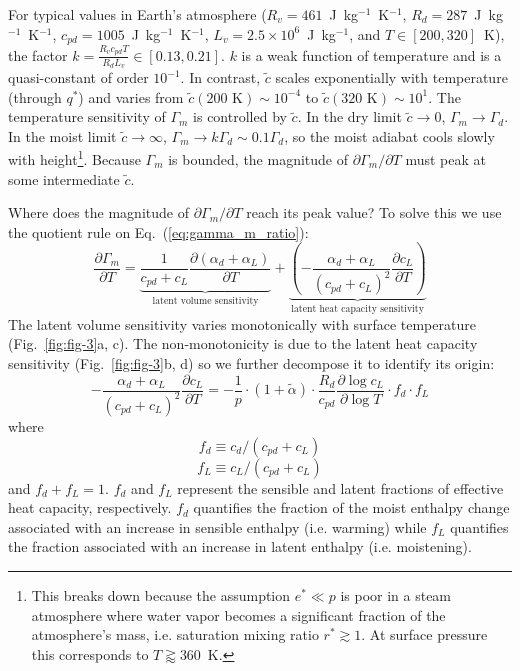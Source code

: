\documentclass[draft]{ametsocV6.1}
\begin{document}
For typical values in Earth's atmosphere ($R_v=461$~J~kg$^{-1}$~K$^{-1}$, $R_d=287$~J~kg$^{-1}$~K$^{-1}$, $c_{pd}=1005$~J~kg$^{-1}$~K$^{-1}$, $L_v=2.5\times10^6$~J~kg$^{-1}$, and $T \in [200, 320]$~K), the factor $k=\frac{R_v c_{pd}T}{R_dL_v}\in [0.13, 0.21]$. $k$ is a weak function of temperature and is a quasi-constant of order $10^{-1}$. In contrast, $\tilde{c}$ scales exponentially with temperature (through $q^*$) and varies from $\tilde{c}(200\text{~K})\sim 10^{-4}$ to $\tilde{c}(320\text{~K})\sim 10^{1}$. The temperature sensitivity of $\Gamma_m$ is controlled by $\tilde{c}$. In the dry limit $\tilde{c}\to0$, $\Gamma_m\to\Gamma_d$. In the moist limit $\tilde{c} \to \infty$, $\Gamma_m\to k\Gamma_d\sim 0.1\Gamma_d$, so the moist adiabat cools slowly with height\footnote{This breaks down because the assumption $e^*\ll p$ is poor in a steam atmosphere where water vapor becomes a significant fraction of the atmosphere's mass, i.e. saturation mixing ratio $r^*\gtrsim1$. At surface pressure this corresponds to $T\gtrapprox 360$~K.}. Because $\Gamma_m$ is bounded, the magnitude of $\partial\Gamma_m/\partial T$ must peak at some intermediate $\tilde{c}$.

Where does the magnitude of $\partial\Gamma_m/\partial T$ reach its peak value? To solve this we use the quotient rule on Eq.~(\ref{eq:gamma_m_ratio}):
\begin{equation}
\frac{\partial\Gamma_m}{\partial T} = \underbrace{\frac{1}{c_{pd} + c_L}\frac{\partial(\alpha_d + \alpha_L)}{\partial T}}_{\text{latent volume sensitivity}} + \underbrace{\left(-\frac{\alpha_d + \alpha_L}{(c_{pd} + c_L)^2}\frac{\partial c_L}{\partial T}\right)}_{\text{latent heat capacity sensitivity}} \label{eq:decomposition}
\end{equation}
The latent volume sensitivity varies monotonically with surface temperature (Fig.~\ref{fig:fig-3}a, c). The non-monotonicity is due to the latent heat capacity sensitivity (Fig.~\ref{fig:fig-3}b, d) so we further decompose it to identify its origin:
\begin{equation}
-\frac{\alpha_d + \alpha_L}{(c_{pd} + c_L)^2}\frac{\partial c_L}{\partial T} = -\frac{1}{p} \cdot \left(1 + \tilde{\alpha}\right) \cdot \frac{R_d}{c_{pd}}\frac{\partial\log{c_L}}{\partial \log{T}} \cdot f_d \cdot f_L \label{eq:term_b_intermediate}
\end{equation}
where
\begin{equation}
f_d \equiv c_{d}/(c_{pd} + c_L) \label{eq:f_d}
\end{equation}
\begin{equation}
f_L \equiv c_{L}/(c_{pd} + c_L) \label{eq:f_L}
\end{equation}
and $f_d + f_L = 1$. $f_d$ and $f_L$ represent the sensible and latent fractions of effective heat capacity, respectively. $f_d$ quantifies the fraction of the moist enthalpy change associated with an increase in sensible enthalpy (i.e. warming) while $f_L$ quantifies the fraction associated with an increase in latent enthalpy (i.e. moistening).
\end{document}
